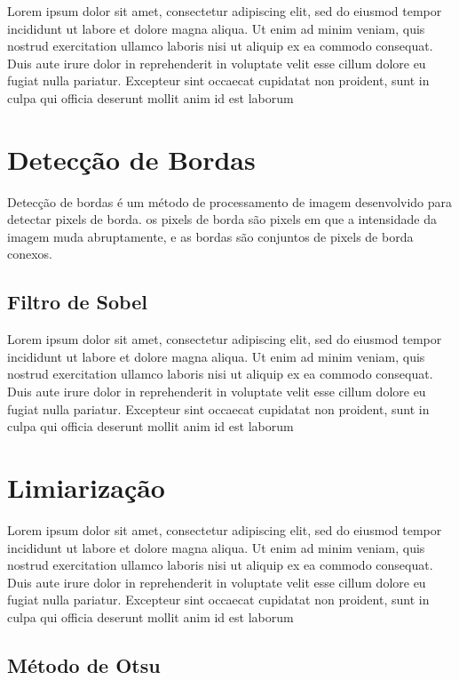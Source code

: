 Lorem ipsum dolor sit amet, consectetur adipiscing elit, sed do eiusmod tempor incididunt ut labore et dolore magna aliqua. Ut enim ad minim veniam, quis nostrud exercitation ullamco laboris nisi ut aliquip ex ea commodo consequat. Duis aute irure dolor in reprehenderit in voluptate velit esse cillum dolore eu fugiat nulla pariatur. Excepteur sint occaecat cupidatat non proident, sunt in culpa qui officia deserunt mollit anim id est laborum

\section{Detecção de Bordas}
\label{sec:detecbordas}

Detecção de bordas é um método de processamento de imagem desenvolvido para detectar pixels de borda. os pixels de borda são pixels em que a intensidade da imagem muda abruptamente, e as bordas são conjuntos de pixels de borda conexos.\cite{gonzalez1977digital}

\subsection{Filtro de Sobel}
\label{sec:sobel}

Lorem ipsum dolor sit amet, consectetur adipiscing elit, sed do eiusmod tempor incididunt ut labore et dolore magna aliqua. Ut enim ad minim veniam, quis nostrud exercitation ullamco laboris nisi ut aliquip ex ea commodo consequat. Duis aute irure dolor in reprehenderit in voluptate velit esse cillum dolore eu fugiat nulla pariatur. Excepteur sint occaecat cupidatat non proident, sunt in culpa qui officia deserunt mollit anim id est laborum

\section{Limiarização}
\label{sec:limiarizacao}

Lorem ipsum dolor sit amet, consectetur adipiscing elit, sed do eiusmod tempor incididunt ut labore et dolore magna aliqua. Ut enim ad minim veniam, quis nostrud exercitation ullamco laboris nisi ut aliquip ex ea commodo consequat. Duis aute irure dolor in reprehenderit in voluptate velit esse cillum dolore eu fugiat nulla pariatur. Excepteur sint occaecat cupidatat non proident, sunt in culpa qui officia deserunt mollit anim id est laborum

\subsection{Método de Otsu}
\label{sec:otsu}

